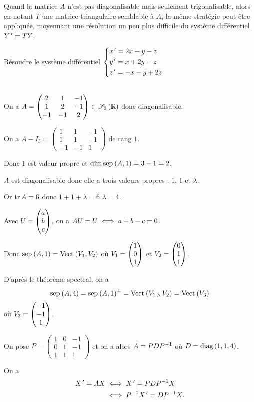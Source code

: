 Quand la matrice \(A\) n'est pas diagonalisable mais seulement trigonalisable, alors en notant \(T\) une matrice triangulaire semblable à \(A\), la même stratégie peut être appliquée, moyennant une résolution un peu plus difficile du système différentiel \(Y^{\,\prime}=TY\).

\begin{exo}
Résoudre le système différentiel \(\begin{dcases}
x^{\,\prime}=2x+y-z \\
y^{\,\prime}=x+2y-z \\
z^{\,\prime}=-x-y+2z
\end{dcases}\)
\end{exo}

\begin{corr}~\\
On a \(A=\begin{pmatrix}
2 & 1 & -1 \\
1 & 2 & -1 \\
-1 & -1 & 2
\end{pmatrix}\in\sym{3}[\R]\) donc diagonalisable.

On a \(A-I_3=\begin{pmatrix}
1 & 1 & -1 \\
1 & 1 & -1 \\
-1 & -1 & 1
\end{pmatrix}\) de rang \(1\).

Donc \(1\) est valeur propre et \(\dim\sep{A}{1}=3-1=2\).

\(A\) est diagonalisable donc elle a trois valeurs propres : \(1\), \(1\) et \(\lambda\).

Or \(\operatorname{tr} A=6\) donc \(1+1+\lambda=6\) \ie \(\lambda=4\).

Avec \(U=\begin{pmatrix}a\\b\\c\end{pmatrix}\), on a \(AU=U\iff a+b-c=0\).

Donc \(\sep{A}{1}=\Vect{V_1,V_2}\) où \(V_1=\begin{pmatrix}1\\0\\1\end{pmatrix}\) et \(V_2=\begin{pmatrix}0\\1\\1\end{pmatrix}\).

D'après le théorème spectral, on a \[\sep{A}{4}=\sep{A}{1}\ortho=\Vect{V_1\vecto V_2}=\Vect{V_3}\] où \(V_3=\begin{pmatrix}-1\\-1\\1\end{pmatrix}\).

On pose \(P=\begin{pmatrix}
1 & 0 & -1 \\
0 & 1 & -1 \\
1 & 1 & 1
\end{pmatrix}\) et on a alors \(A=PDP^{-1}\) où \(D=\operatorname{diag}\left(1,1,4\right)\).

On a \[\begin{aligned}
X^{\,\prime}=AX&\iff X^{\,\prime}=PDP^{-1} X \\
&\iff P^{-1} X^{\,\prime}=DP^{-1} X.
\end{aligned}\]


\end{corr}
